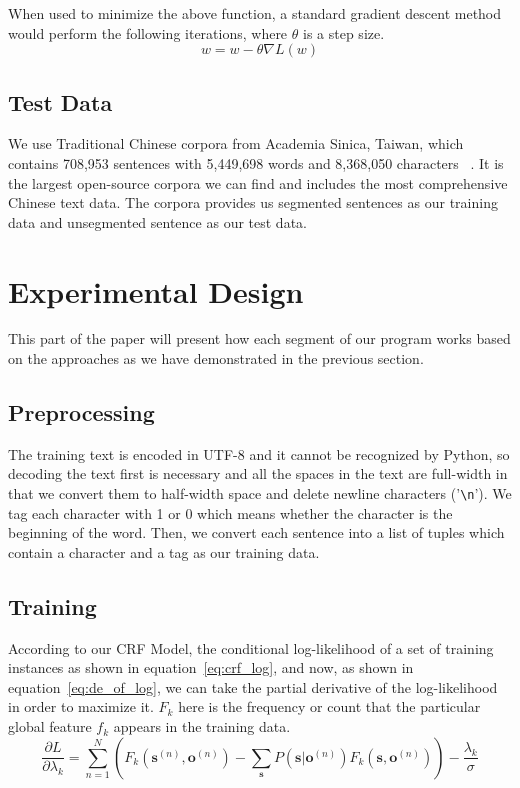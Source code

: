 \documentclass[UTF8,11pt]{article}
\begin{document}
When used to minimize the above function, a standard gradient descent method would perform the following iterations, where $\theta$ is a step size.
\begin{equation}
    w = w - \theta \nabla L (w)
\end{equation}

\subsection{Test Data}
\noindent We use Traditional Chinese corpora from Academia Sinica, Taiwan, which contains 708,953 sentences with 5,449,698 words and 8,368,050 characters~\cite{bakeoff_data} . It is the largest open-source corpora we can find and includes the most comprehensive Chinese text data. The corpora provides us segmented sentences as our training data and unsegmented sentence as our test data.

\section{Experimental Design}
\noindent This part of the paper will present how each segment of our program works based on the approaches as we have demonstrated in the previous section. 
\subsection{Preprocessing}
\noindent The training text is encoded in UTF-8 and it cannot be recognized by Python, so decoding the text first is necessary and all the spaces in the text are full-width in that we convert them to half-width space and delete newline characters ('\verb!\n!'). We tag each character with 1 or 0 which means whether the character is the beginning of the word. Then, we convert each sentence into a list of tuples which contain a character and a tag as our training data.

\subsection{Training}
\noindent According to our CRF Model, the conditional log-likelihood of a set of training instances as shown in equation~\ref{eq:crf_log}, and now, as shown in equation~\ref{eq:de_of_log}, we can take the partial derivative of the log-likelihood in order to maximize it. $F_k$ here is the frequency or count that the particular global feature $f_k$ appears in the training data.
\begin{equation} \label{eq:de_of_log}
    \frac{\partial L}{\partial \lambda_k} = \sum_{n=1}^{N} \left( F_k ( \mathbf{s}^{(n)}, \mathbf{o}^{(n)} ) - \sum_{\mathbf{s}} P( \mathbf{s} | \mathbf{o}^{(n)}) F_k ( \mathbf{s}, \mathbf{o}^{(n)} ) \right) - \frac{\lambda_k}{\sigma}
\end{equation}
\end{document}
